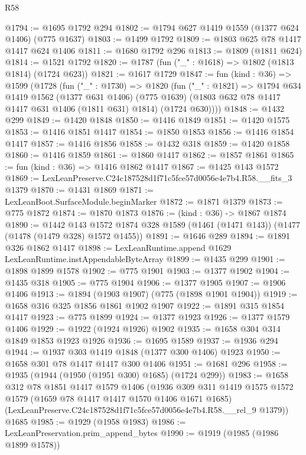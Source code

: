 \begin{lexlean}{R58}
\begin{coremodule}
{{@1794 := @1695 @1792 @294
@1802 := @1794 @627 @1419 @1559 (@1377 @624 @1406) (@775 @1637)
@1803 := @1499 @1792
@1809 := @1803 @625 @78 @1417 @1417 @624 @1406
@1811 := @1680 @1792 @296
@1813 := @1809 (@1811 @624)
@1814 := @1521 @1792
@1820 := @1787 (fun ("_" : @1618) => @1802 (@1813 @1814) (@1724 @623))
@1821 := @1617 @1729
@1847 := fun (kind : @36) =>
  @1599
    (@1728
      (fun ("_" : @1730) =>
      @1820
        (fun ("_" : @1821) =>
        @1794
          @634
          @1419
          @1562
          (@1377 @631 @1406)
          (@775 @1639)
          (@1803 @632 @78 @1417 @1417 @631 @1406 (@1811 @631) @1814)
          (@1724 @630))))
@1848 := @1432 @299
@1849 := @1420 @1848
@1850 := @1416 @1849
@1851 := @1420 @1575
@1853 := @1416 @1851 @1417
@1854 := @1850 @1853
@1856 := @1416 @1854 @1417
@1857 := @1416 @1856
@1858 := @1432 @318
@1859 := @1420 @1858
@1860 := @1416 @1859
@1861 := @1860 @1417
@1862 := @1857 @1861
@1865 := fun (kind : @36) => @1416 @1862 @1417
@1867 := @1425 @143 @1572
@1869 := LexLeanPreserve.C24c187528d1f71c5fce57d0056e4e7b4.R58.__fits_3 @1379
@1870 := @1431 @1869
@1871 := LexLeanBoot.SurfaceModule.beginMarker
@1872 := @1871 @1379
@1873 := @775 @1872
@1874 := @1870 @1873
@1876 := (kind : @36) -> @1867 @1874
@1890 := @1442
    @143
    @1572
    @1874
    @328
    @1589
    (@1461 (@1471 @143))
    (@1477 (@1478 (@1479 @328) @1572 @1455))
@1891 := @1646 @289
@1894 := @1891 @326 @1862 @1417
@1898 := LexLeanRuntime.append @1629 LexLeanRuntime.instAppendableByteArray
@1899 := @1435 @299
@1901 := @1898 @1899 @1578
@1902 := @775 @1901
@1903 := @1377 @1902
@1904 := @1435 @318
@1905 := @775 @1904
@1906 := @1377 @1905
@1907 := @1906 @1406
@1913 := @1894 (@1903 @1907) (@775 (@1898 @1901 @1904))
@1919 := @1658 @316 @325 @1856 @1861 @1902 @1907
@1922 := @1891 @315 @1854 @1417
@1923 := @775 @1899
@1924 := @1377 @1923
@1926 := @1377 @1579 @1406
@1929 := @1922 (@1924 @1926) @1902
@1935 := @1658 @304 @314 @1849 @1853 @1923 @1926
@1936 := @1695 @1589
@1937 := @1936 @294
@1944 := @1937 @303 @1419 @1848 (@1377 @300 @1406) @1923
@1950 := @1658 @301 @78 @1417 @1417 @300 @1406
@1951 := @1681 @296
@1958 := @1935 (@1944 (@1950 (@1951 @300) @1685) (@1724 @299))
@1983 := @1658
    @312
    @78
    @1851
    @1417
    @1579
    @1406
    (@1936
      @309
      @311
      @1419
      @1575
      @1572
      @1579
      (@1659 @78 @1417 @1417 @1570 @1406 @1671 @1685)
      (LexLeanPreserve.C24c187528d1f71c5fce57d0056e4e7b4.R58.__rel_9 @1379))
    @1685
@1985 := @1929 (@1958 @1983)
@1986 := LexLeanPreservation.prim_append_bytes
@1990 := @1919 (@1985 (@1986 @1899 @1578))
}}
\end{coremodule}
\end{lexlean}
